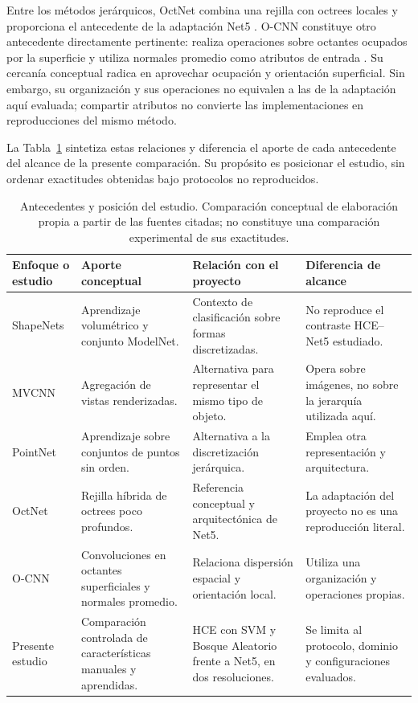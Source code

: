 Entre los métodos jerárquicos, OctNet combina una rejilla con octrees locales y proporciona el antecedente de la adaptación Net5 \parencite{riegler2017}. O-CNN constituye otro antecedente directamente pertinente: realiza operaciones sobre octantes ocupados por la superficie y utiliza normales promedio como atributos de entrada \parencite{wang2017ocnn}. Su cercanía conceptual radica en aprovechar ocupación y orientación superficial. Sin embargo, su organización y sus operaciones no equivalen a las de la adaptación aquí evaluada; compartir atributos no convierte las implementaciones en reproducciones del mismo método.

La Tabla~\ref{tab:antecedentes} sintetiza estas relaciones y diferencia el aporte de cada antecedente del alcance de la presente comparación. Su propósito es posicionar el estudio, sin ordenar exactitudes obtenidas bajo protocolos no reproducidos.
\begin{table}[htbp]
\centering\small
\setlength{\tabcolsep}{4pt}
\caption{Antecedentes y posición del estudio. Comparación conceptual de elaboración propia a partir de las fuentes citadas; no constituye una comparación experimental de sus exactitudes.}
\label{tab:antecedentes}
\begin{tabularx}{\textwidth}{@{}>{\raggedright\arraybackslash}p{2.25cm}>{\raggedright\arraybackslash}X>{\raggedright\arraybackslash}X>{\raggedright\arraybackslash}X@{}}
\toprule
Enfoque o estudio & Aporte conceptual & Relación con el proyecto & Diferencia de alcance \\
\midrule
ShapeNets \parencite{wu2015} & Aprendizaje volumétrico y conjunto ModelNet. & Contexto de clasificación sobre formas discretizadas. & No reproduce el contraste HCE--Net5 estudiado. \\
MVCNN \parencite{su2015} & Agregación de vistas renderizadas. & Alternativa para representar el mismo tipo de objeto. & Opera sobre imágenes, no sobre la jerarquía utilizada aquí. \\
PointNet \parencite{qi2017} & Aprendizaje sobre conjuntos de puntos sin orden. & Alternativa a la discretización jerárquica. & Emplea otra representación y arquitectura. \\
OctNet \parencite{riegler2017} & Rejilla híbrida de octrees poco profundos. & Referencia conceptual y arquitectónica de Net5. & La adaptación del proyecto no es una reproducción literal. \\
O-CNN \parencite{wang2017ocnn} & Convoluciones en octantes superficiales y normales promedio. & Relaciona dispersión espacial y orientación local. & Utiliza una organización y operaciones propias. \\
Presente estudio & Comparación controlada de características manuales y aprendidas. & HCE con SVM y Bosque Aleatorio frente a Net5, en dos resoluciones. & Se limita al protocolo, dominio y configuraciones evaluados. \\
\bottomrule
\end{tabularx}
\end{table}

